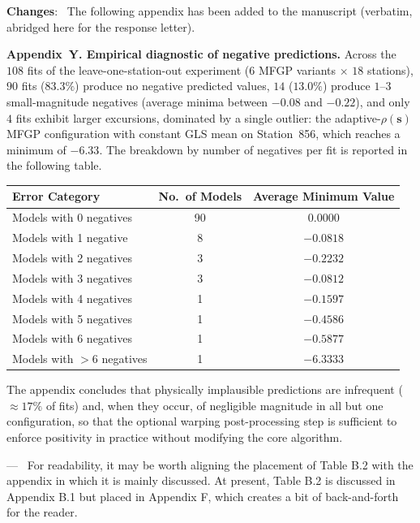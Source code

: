 \documentclass[12pt]{article}
\newcommand{\0}{\mathbf{0}}
\newcounter{reviewer}
\newcounter{point}[reviewer]
\renewcommand{\thepoint}{P\,\thereviewer.\arabic{point}}
\newenvironment{point}
   {\refstepcounter{point} \bigskip \noindent {\textbf{Point~\thepoint} } ---\ }
   {\par }
\newenvironment{changes}
   {\medskip \noindent \begin{sf}\color{ForestGreen}\textbf{Changes}:\  }
   {\medskip \end{sf}}
\begin{document}
\begin{changes}
The following appendix has been added to the manuscript (verbatim, abridged here for the response letter).

\medskip
\noindent\textbf{Appendix~Y. Empirical diagnostic of negative predictions.}
Across the $108$ fits of the leave-one-station-out experiment ($6$ MFGP variants $\times$ $18$ stations), $90$ fits ($83.3\%$) produce no negative predicted values, $14$ ($13.0\%$) produce $1$--$3$ small-magnitude negatives (average minima between $-0.08$ and $-0.22$), and only $4$ fits exhibit larger excursions, dominated by a single outlier: the adaptive-$\rho(\bm{s})$ MFGP configuration with constant GLS mean on Station~856, which reaches a minimum of $-6.33$. The breakdown by number of negatives per fit is reported in the following table.

\begin{center}
\small
\begin{tabular}{@{}lcc@{}}
\toprule
Error Category & No.\ of Models & Average Minimum Value \\ \midrule
Models with 0 negatives    & 90 & \phantom{$-$}0.0000 \\
Models with 1 negative     & 8  & $-0.0818$ \\
Models with 2 negatives    & 3  & $-0.2232$ \\
Models with 3 negatives    & 3  & $-0.0812$ \\
Models with 4 negatives    & 1  & $-0.1597$ \\
Models with 5 negatives    & 1  & $-0.4586$ \\
Models with 6 negatives    & 1  & $-0.5877$ \\
Models with $>6$ negatives & 1  & $-6.3333$ \\ \bottomrule
\end{tabular}
\end{center}

The appendix concludes that physically implausible predictions are infrequent ($\approx 17\%$ of fits) and, when they occur, of negligible magnitude in all but one configuration, so that the optional warping post-processing step is sufficient to enforce positivity in practice without modifying the core algorithm.
\end{changes}


\begin{point}
For readability, it may be worth aligning the placement of Table B.2 with the appendix in which it is mainly discussed. At present, Table B.2 is discussed in Appendix B.1 but placed in Appendix F, which creates a bit of back-and-forth for the reader.
\end{point}
\end{document}
